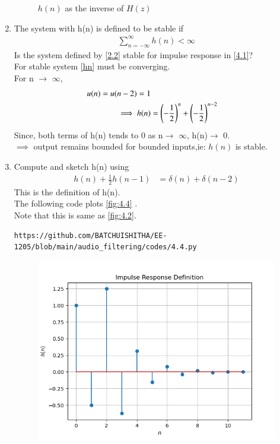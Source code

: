 \documentclass[journal,12pt,twocolumn]{IEEEtran}
\theoremstyle{remark}
\begin{document}
\begin{enumerate}[label=\thesection.\arabic*]
\begin{figure}[ht]
	\caption{$h(n)$ as the inverse of $H(z)$}
	\label{fig:4.2}
\end{figure}
\item The system with h(n) is defined to be stable if
\begin{align}
\sum_{n=-\infty}^{\infty}h(n) < \infty \label{hn}
\end{align}
Is the system defined by \eqref{2.2} stable for impulse response in \eqref{4.1}?\\
\solution For stable system \eqref{hn} must be converging.\\
For n $\rightarrow$ $\infty$,
\begin{align}
u(n)=u(n-2)=1\\
\implies h(n) &= \left(-\frac{1}{2}\right)^{n}+ \left(-\frac{1}{2}\right)^{n-2}
\end{align}
Since, both terms of h(n) tends to 0 as n$\rightarrow$ $\infty$, h(n)$\rightarrow$ $0$.\\
$\implies$ output remains bounded for bounded inputs,ie: $h(n)$ is stable.
\item Compute  and sketch h(n) using 
\begin{align}
h(n) + \frac{1}{2}h(n-1) &= \delta(n)+\delta(n-2)
\end{align}
This is the definition of h(n).\\
\solution The following code plots \eqref{fig:4.4} .\\
Note that this is same as \eqref{fig:4.2}.
\begin{lstlisting}
https://github.com/BATCHUISHITHA/EE-1205/blob/main/audio_filtering/codes/4.4.py
\end{lstlisting}
\begin{figure}[ht]
	\centering
	\includegraphics[width=\columnwidth]{figs/4.4.png}

\end{figure}
\end{enumerate}
\end{document}
